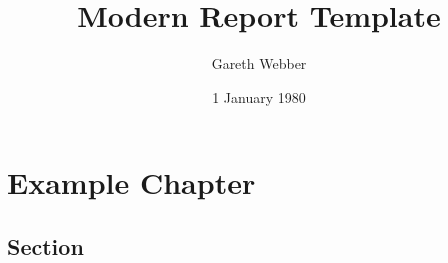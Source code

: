 \documentclass[11pt]{report}
\begin{document}
\title{Modern Report Template}
\date{1 January 1980}
\author{Gareth Webber}
\covertext{\lipsum[1]}
\maketitle

\tableofcontents

\chapter{Example Chapter}
\lipsum[1-8]
\section{Section}
\lipsum[8-12]
\end{document}
